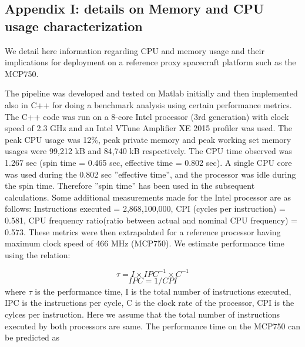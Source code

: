 \subsection{Appendix I: details on Memory and CPU usage characterization}
We detail here information regarding  CPU and memory usage and their implications for deployment on a reference proxy spacecraft platform such as the MCP750.

%
The pipeline was developed and tested on Matlab initially and then implemented also in C++ for doing a benchmark analysis using certain performance metrics. The C++ code was run on a 8-core Intel processor (3rd generation) with clock speed of 2.3 GHz and an Intel VTune Amplifier XE 2015 profiler was used. The peak CPU usage was 12\%, peak private memory and peak working set memory usages were 99,212 kB and 84,740 kB respectively. The CPU time observed was 1.267 sec (spin time = 0.465 sec, effective time = 0.802 sec). A single CPU core was used during the 0.802 sec ''effective time'', and the processor was idle during the spin time. Therefore ''spin time'' has been used in the subsequent calculations. Some additional measurements made for the Intel processor are as follows:
        Instructions executed = 2,868,100,000, 
        CPI (cycles per instruction) = 0.581, 
        CPU frequency ratio(ratio between actual and nominal CPU frequency) = 0.573.
%        
These metrics were then extrapolated for a reference processor having maximum clock speed of 466 MHz (MCP750). We estimate performance time using the relation:
        
        \begin{equation}
        \tau = I\times IPC^{-1}\times C^{-1}
        \end{equation}
        \begin{equation}
        IPC = 1/CPI
        \end{equation}
        \noindent where $\tau$ is the performance time, I is the total number of instructions executed, IPC is the instructions per cycle, C is the clock rate of the processor, CPI is the cylces per instruction.
        Here we assume that the total number of instructions executed by both processors are same. The performance time on the MCP750 can be predicted as
        
